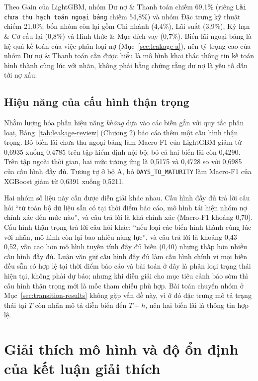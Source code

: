Theo Gain của LightGBM, nhóm Dư nợ \& Thanh toán chiếm 69,1\% (riêng \texttt{Lãi chưa thu hạch toán ngoại bảng} chiếm 54,8\%) và nhóm Đặc trưng kỹ thuật chiếm 21,0\%; bốn nhóm còn lại gồm Chi nhánh (4,4\%), Lãi suất (3,9\%), Kỳ hạn \& Cơ cấu lại (0,8\%) và Hình thức \& Mục đích vay (0,7\%). Biến lãi ngoại bảng là hệ quả kế toán của việc phân loại nợ (Mục~\ref{sec:leakage-a}), nên tỷ trọng cao của nhóm Dư nợ \& Thanh toán cần được hiểu là mô hình khai thác thông tin kế toán hình thành cùng lúc với nhãn, không phải bằng chứng rằng dư nợ là yếu tố dẫn tới nợ xấu.

\subsection{Hiệu năng của cấu hình thận trọng}
\label{sec:conservative-config}

Nhằm lượng hóa phần hiệu năng \emph{không} dựa vào các biến gắn với quy tắc phân loại, Bảng~\ref{tab:leakage-review} (Chương 2) báo cáo thêm một cấu hình thận trọng. Bỏ biến lãi chưa thu ngoại bảng làm Macro-F1 của LightGBM giảm từ 0,6935 xuống 0,4785 trên tập kiểm định nội bộ; bỏ cả hai biến lãi còn 0,4290. Trên tập ngoài thời gian, hai mức tương ứng là 0,5175 và 0,4728 so với 0,6985 của cấu hình đầy đủ. Tương tự ở bộ A, bỏ \mbox{\texttt{DAYS\_TO\_MATURITY}} làm Macro-F1 của XGBoost giảm từ 0,6391 xuống 0,5211.

Hai nhóm số liệu này cần được diễn giải khác nhau. Cấu hình đầy đủ trả lời câu hỏi ``từ toàn bộ dữ liệu sẵn có tại thời điểm báo cáo, mô hình tái hiện nhóm nợ chính xác đến mức nào'', và câu trả lời là khá chính xác (Macro-F1 khoảng 0,70). Cấu hình thận trọng trả lời câu hỏi khác: ``nếu loại các biến hình thành cùng lúc với nhãn, mô hình còn lại bao nhiêu năng lực'', và câu trả lời là khoảng 0,43--0,52, vẫn cao hơn mô hình tuyến tính đầy đủ biến (0,40) nhưng thấp hơn nhiều cấu hình đầy đủ. Luận văn giữ cấu hình đầy đủ làm cấu hình chính vì mọi biến đều sẵn có hợp lệ tại thời điểm báo cáo và bài toán ở đây là phân loại trạng thái hiện tại, không phải dự báo; nhưng khi diễn giải cho mục tiêu cảnh báo sớm thì cấu hình thận trọng mới là mốc tham chiếu phù hợp. Bài toán chuyển nhóm ở Mục~\ref{sec:transition-results} không gặp vấn đề này, vì ở đó đặc trưng mô tả trạng thái tại $T$ còn nhãn mô tả diễn biến đến $T+h$, nên hai biến lãi là thông tin hợp lệ.

\section{Giải thích mô hình và độ ổn định của kết luận giải thích}
\label{sec:shap-results}

